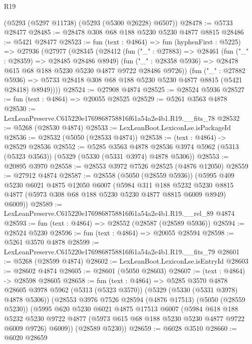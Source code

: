 \begin{lexlean}{R19}
\begin{coremodule}
    (@5293 (@5297 @11738) (@5293 (@5300 @26228) @6507))
@28478 := @5733 @28477
@28485 := @28478 @308 @68 @188 @5230 @5230 @4877 @8815
@28486 := @5421 @28477
@28523 := fun (text : @4864) =>
  fun (hyphenFirst : @5225) =>
  @27936
    (@27977
      (@28345
        (@28412
          (fun ("_" : @27883) =>
          @28461
            (fun ("_" : @28359) => @28485 @28486 @8949)
            (fun ("_" : @28358 @5936) => @28478 @615 @68 @188 @5230 @5230 @4877 @9722 @28486 @9726))
          (fun ("_" : @27882 @5936) =>
          @5733 @28418 @308 @68 @188 @5230 @5230 @4877 @8815 (@5421 @28418) @8949))))
@28524 := @27908 @4874
@28525 := @28524 @5936
@28527 := fun (text : @4864) => @20055 @28525
@28529 := @5261 @3563 @4878
@28530 := LexLeanPreserve.C615220e1769868758816f61a54a2e4b1.R19.__fits_78
@28532 := @5268 (@28530 @4874)
@28533 := LexLeanBoot.LexiconLse.isPackageId
@28536 := @28532 (@5050 (@28533 @4874))
@28538 := (text : @4864) -> @28529 @28536
@28552 := @5285
    @3563
    @4878
    @28536
    @3974
    @5962
    (@5313 (@5323 @3563))
    (@5329 (@5330 (@5331 @3974) @4878 @5306))
@28553 := @20895 @3970
@28558 := @28553 @3972 @7526 @28525 (@4876 @12050)
@28559 := @27912 @4874
@28587 := @28558
    (@5050 (@28559 @5936))
    (@5995
      @409
      @5230
      @6021
      @4875
      @12050
      @6007
      (@5984
        @311
        @188
        @5232
        @5230
        @8815
        @4877
        (@5973 @308 @68 @188 @5230 @5230 @4877 @8815 @6009 @8949)
        @6009))
@28589 := LexLeanPreserve.C615220e1769868758816f61a54a2e4b1.R19.__rel_89 @4874
@28593 := fun (text : @4864) => @28552 (@28587 (@28589 @5936))
@28594 := @28524 @5230
@28596 := fun (text : @4864) => @20055 @28594
@28598 := @5261 @3570 @4878
@28599 := LexLeanPreserve.C615220e1769868758816f61a54a2e4b1.R19.__fits_79
@28601 := @5268 (@28599 @4874)
@28602 := LexLeanBoot.LexiconLse.isEntryId
@28603 := @28602 @4874
@28605 := @28601 (@5050 @28603)
@28607 := (text : @4864) -> @28598 @28605
@28658 := fun (text : @4864) =>
  @5285
    @3570
    @4878
    @28605
    @3978
    @5962
    (@5313 (@5323 @3570))
    (@5329 (@5330 (@5331 @3978) @4878 @5306))
    (@28553
      @3976
      @7526
      @28594
      (@4876 @17513)
      (@5050 (@28559 @5230))
      (@5995
        @620
        @5230
        @6021
        @4875
        @17513
        @6007
        (@5984
          @618
          @188
          @5232
          @5230
          @9722
          @4877
          (@5973 @615 @68 @188 @5230 @5230 @4877 @9722 @6009 @9726)
          @6009))
      (@28589 @5230))
@28659 := @6028 @3510
@28660 := @6020 @28659

\end{coremodule}
\end{lexlean}
